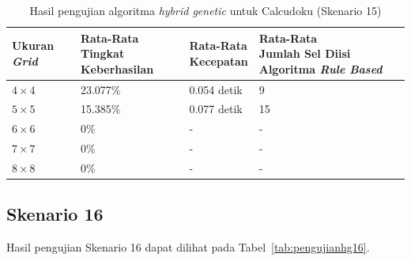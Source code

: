 \begin{table}
\centering
\captionsetup{justification=centering}
\caption[Hasil pengujian algoritma \textit{hybrid genetic} untuk Calcudoku (Skenario 15)]{Hasil pengujian algoritma \textit{hybrid genetic} untuk Calcudoku (Skenario 15)}
\begin{tabular}{| l | l | l | l |}
\hline
Ukuran \textit{Grid} & \makecell[l]{Rata-Rata \\ Tingkat Keberhasilan} & \makecell[l]{Rata-Rata \\ Kecepatan} & \makecell[l]{Rata-Rata \\ Jumlah Sel Diisi Algoritma \textit{Rule Based}} \\
\hline \hline
\begin{math}4 \times 4\end{math} & 23.077\% & 0.054 detik & 9 \\
\hline
\begin{math}5 \times 5\end{math} & 15.385\% & 0.077 detik & 15 \\
\hline
\begin{math}6 \times 6\end{math} & 0\% & - & - \\
\hline
\begin{math}7 \times 7\end{math} & 0\% & - & - \\
\hline
\begin{math}8 \times 8\end{math} & 0\% & - & - \\
\hline
\end{tabular}
\label{tab:pengujianhg15}
\end{table}

\subsection{Skenario 16}
\label{sec:skenario16}

Hasil pengujian Skenario 16 dapat dilihat pada Tabel~\ref{tab:pengujianhg16}.


